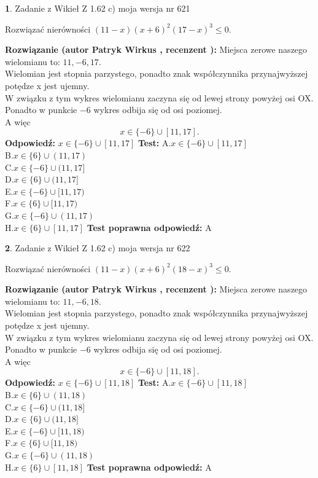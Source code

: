 \documentclass[12pt, a4paper]{article}
\theoremstyle{definition} %
\newtheorem{zad}{}
\newcommand{\zadStart}[1]{\begin{zad}#1\newline}
\newcommand{\zadStop}{\end{zad}}
\newcommand{\rozwStart}[2]{\noindent \textbf{Rozwiązanie (autor #1 , recenzent #2): }\newline}
\newcommand{\rozwStop}{\newline}
\newcommand{\odpStart}{\noindent \textbf{Odpowiedź:}\newline}
\newcommand{\odpStop}{\newline}
\newcommand{\testStart}{\noindent \textbf{Test:}\newline}
\newcommand{\testStop}{\newline}
\newcommand{\kluczStart}{\noindent \textbf{Test poprawna odpowiedź:}\newline}
\newcommand{\kluczStop}{\newline}
\begin{document}
\zadStart{Zadanie z Wikieł Z 1.62 c) moja wersja nr 621}

Rozwiązać nierówności $(11-x)(x+6)^{2}(17-x)^{3}\le0$.
\zadStop
\rozwStart{Patryk Wirkus}{}
Miejsca zerowe naszego wielomianu to: $11, -6, 17$.\\
Wielomian jest stopnia parzystego, ponadto znak współczynnika przy\linebreak najwyższej potędze x jest ujemny.\\ W związku z tym wykres wielomianu zaczyna się od lewej strony powyżej osi OX.\\
Ponadto w punkcie $-6$ wykres odbija się od osi poziomej.\\
A więc $$x \in \{-6\} \cup [11,17].$$
\rozwStop
\odpStart
$x \in \{-6\} \cup [11,17]$
\odpStop
\testStart
A.$x \in \{-6\} \cup [11,17]$\\
B.$x \in \{6\} \cup (11,17)$\\
C.$x \in \{-6\} \cup (11,17]$\\
D.$x \in \{6\} \cup (11,17]$\\
E.$x \in \{-6\} \cup [11,17)$\\
F.$x \in \{6\} \cup [11,17)$\\
G.$x \in \{-6\} \cup (11,17)$\\
H.$x \in \{6\} \cup [11,17]$
\testStop
\kluczStart
A
\kluczStop



\zadStart{Zadanie z Wikieł Z 1.62 c) moja wersja nr 622}

Rozwiązać nierówności $(11-x)(x+6)^{2}(18-x)^{3}\le0$.
\zadStop
\rozwStart{Patryk Wirkus}{}
Miejsca zerowe naszego wielomianu to: $11, -6, 18$.\\
Wielomian jest stopnia parzystego, ponadto znak współczynnika przy\linebreak najwyższej potędze x jest ujemny.\\ W związku z tym wykres wielomianu zaczyna się od lewej strony powyżej osi OX.\\
Ponadto w punkcie $-6$ wykres odbija się od osi poziomej.\\
A więc $$x \in \{-6\} \cup [11,18].$$
\rozwStop
\odpStart
$x \in \{-6\} \cup [11,18]$
\odpStop
\testStart
A.$x \in \{-6\} \cup [11,18]$\\
B.$x \in \{6\} \cup (11,18)$\\
C.$x \in \{-6\} \cup (11,18]$\\
D.$x \in \{6\} \cup (11,18]$\\
E.$x \in \{-6\} \cup [11,18)$\\
F.$x \in \{6\} \cup [11,18)$\\
G.$x \in \{-6\} \cup (11,18)$\\
H.$x \in \{6\} \cup [11,18]$
\testStop
\kluczStart
A
\kluczStop
\end{document}
